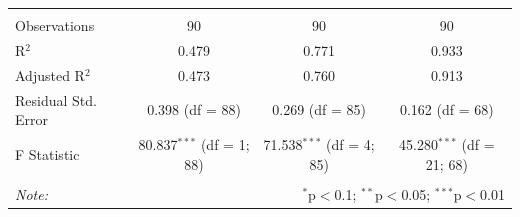 \begin{table}[!htbp]
\begin{tabular}{@{\extracolsep{2pt}}lccc}
		& & & \\ 
		\hline \\[-1.8ex] 
		Observations & 90 & 90 & 90 \\ 
		R$^{2}$ & 0.479 & 0.771 & 0.933 \\ 
		Adjusted R$^{2}$ & 0.473 & 0.760 & 0.913 \\ 
		Residual Std. Error & 0.398 (df = 88) & 0.269 (df = 85) & 0.162 (df = 68) \\ 
		F Statistic & 80.837$^{***}$ (df = 1; 88) & 71.538$^{***}$ (df = 4; 85) & 45.280$^{***}$ (df = 21; 68) \\ 
		\hline 
		\hline \\[-1.8ex] 
		\textit{Note:}  & \multicolumn{3}{r}{$^{*}$p$<$0.1; $^{**}$p$<$0.05; $^{***}$p$<$0.01} \\ 
	\end{tabular} 
\end{table} 